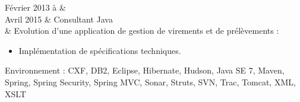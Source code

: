 Février 2013 à &  \\%
Avril 2015     & Consultant Java \\%
			   & Evolution d'une application de gestion de virements et de prélèvements :%
			   \begin{itemize}%
    				\item Implémentation de spécifications techniques.%
			   \end{itemize}%
Environnement : CXF, DB2, Eclipse, Hibernate, Hudson, Java SE 7, Maven, Spring, Spring Security, Spring MVC, Sonar, Struts, SVN, Trac, Tomcat, XML, XSLT \\\\
